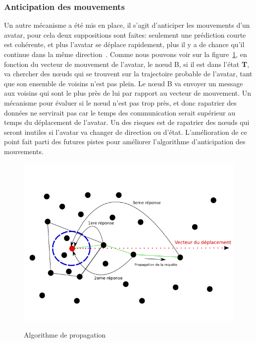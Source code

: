 	\subsubsection{Anticipation des mouvements}
	Un autre mécanisme a été mis en place, il s'agit d'anticiper les mouvements d'un avatar, pour cela deux suppositions sont faites: seulement une prédiction courte est cohérente, et plus l'avatar se déplace rapidement, plus il y a de chance qu'il continue dans la même direction~\cite{191}. Comme nous pouvons voir sur la figure~\ref{Propa_Algo}, en fonction du vecteur de mouvement de l'avatar, le nœud B, si il est dans l'état \textbf{T}, va chercher des nœuds qui se trouvent sur la trajectoire probable de l'avatar, tant que son ensemble de voisins n'est pas plein. Le nœud B va envoyer un message aux voisins qui sont le plus près de lui par rapport au vecteur de mouvement. Un mécanisme pour évaluer si le nœud n'est pas trop près, et donc rapatrier des données ne servirait pas car le temps des communication serait supérieur au temps du déplacement de l'avatar. Un des risques est de rapatrier des nœuds qui seront inutiles si l'avatar va changer de direction ou d'état. L'amélioration de ce point fait parti des futures pistes pour améliorer l'algorithme d'anticipation des mouvements.\\
	\vspace{5mm}
        \begin{figure}[!h]
        \centering
        \includegraphics[scale=0.5]{./Ressources/Images/propagation_algo.png}\\
        \caption{Algorithme de propagation}
        \label{Propa_Algo}
        \end{figure}
        \vspace{5mm}
